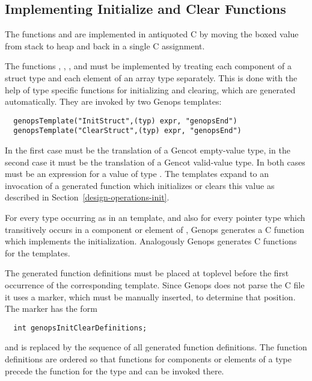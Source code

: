 \subsection{Implementing Initialize and Clear Functions}
\label{impl-operations-init}

The functions  and  are implemented in antiquoted C by moving the boxed value from stack
to heap and back in a single C assignment.

The functions , , , and  must be implemented by treating
each component of a struct type and each element of an array type separately. This is done with the help of type specific
functions for initializing and clearing, which are generated automatically. They are invoked by two Genops templates:
\begin{verbatim}
  genopsTemplate("InitStruct",(typ) expr, "genopsEnd")
  genopsTemplate("ClearStruct",(typ) expr, "genopsEnd")
\end{verbatim}
In the first case  must be the translation of a Gencot empty-value type, in the second case it must be the translation 
of a Gencot valid-value type. In both cases  must be an expression for a value of type . The templates
expand to an invocation of a generated function which initializes or clears this value as described in 
Section~\ref{design-operations-init}.

For every type  occurring as  in an  template, and also for every pointer type  which 
transitively occurs in a component or element of , Genops generates a C function  which implements
the initialization. Analogously Genops generates C functions  for the  templates.

The generated function definitions must be placed at toplevel before the first occurrence of the corresponding template. Since
Genops does not parse the C file it uses a marker, which must be manually inserted, to determine that position. The marker has 
the form
\begin{verbatim}
  int genopsInitClearDefinitions;
\end{verbatim}
and is replaced by the sequence of all generated function definitions. The function definitions are ordered so that functions
for components or elements of a type precede the function for the type and can be invoked there.

